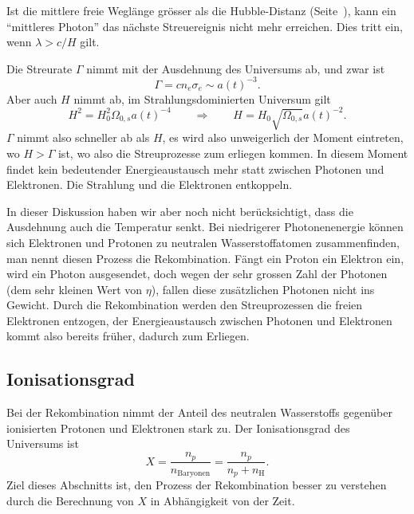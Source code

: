 Ist die mittlere freie Weglänge grösser als die Hubble-Distanz
(Seite~\pageref{skript:section:hubble-distanz}),
kann ein ``mittleres Photon'' das nächste Streuereignis nicht
mehr erreichen.
Dies tritt ein, wenn $\lambda > c/H$ gilt.


Die Streurate $\Gamma$ nimmt mit der Ausdehnung des Universums ab,
und zwar ist
\[
\Gamma
=
cn_e\sigma_e
\sim
a(t)^{-3}.
\]
Aber auch $H$ nimmt ab,
im Strahlungsdominierten Universum gilt
\[
H^2 = H_0^2  \Omega_{0,s} a(t)^{-4}
\qquad\Rightarrow\qquad
H=H_0\sqrt{\Omega_{0,s}} a(t)^{-2}.
\]
$\Gamma$ nimmt also schneller ab als $H$, es wird also unweigerlich
der Moment eintreten, wo $H>\Gamma$ ist, wo also die Streuprozesse
zum erliegen kommen.
In diesem Moment findet kein bedeutender Energieaustausch mehr statt
zwischen Photonen und Elektronen.
Die Strahlung und die Elektronen entkoppeln.

In dieser Diskussion haben wir aber noch nicht berücksichtigt, dass
die Ausdehnung auch die Temperatur senkt.
Bei niedrigerer Photonenenergie können sich Elektronen und Protonen
zu neutralen Wasserstoffatomen zusammenfinden, man nennt diesen
Prozess die Rekombination.
Fängt ein Proton ein Elektron ein, wird ein Photon ausgesendet,
doch wegen der sehr grossen Zahl der Photonen (dem sehr kleinen Wert
von $\eta$), fallen diese zusätzlichen Photonen nicht ins Gewicht.
Durch die Rekombination werden den Streuprozessen die freien Elektronen
entzogen, der Energieaustausch zwischen Photonen und Elektronen
kommt also bereits früher, dadurch zum Erliegen.

\subsection{Ionisationsgrad}
Bei der Rekombination nimmt der Anteil des neutralen Wasserstoffs
gegenüber ionisierten Protonen und Elektronen stark zu.
Der Ionisationsgrad des Universums ist 
\begin{equation}
X=\frac{n_p}{n_\text{Baryonen}}=\frac{n_p}{n_p+n_\text{H}}.
\label{skript:cmb:Xb}
\end{equation}
Ziel dieses Abschnitts ist, den Prozess der Rekombination besser zu
verstehen durch die Berechnung von $X$ in Abhängigkeit 
von der Zeit.


